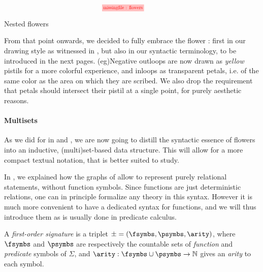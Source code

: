 \begin{scope}
\begin{marginfigure}
  $$
  \!\!\!\!
  \!\!\!\!
  \!\!\!\!
  \!\!\!\!
  \stkfig{0.65}{flowers}
  $$
  \vspace{-3em}
  \caption{Nested flowers}
\end{marginfigure}

From that point onwards, we decided to fully embrace the flower :
first in our drawing style as witnessed in , but also in our
syntactic terminology, to be introduced in the next pages. \kl(eg){Negative}
outloops are now drawn as \emph{yellow} pistils for a more colorful experience,
and inloops as transparent petals, i.e. of the same color as the area on which
they are scribed. We also drop the requirement that petals should intersect
their pistil at a single point, for purely aesthetic reasons.

\paragraph{Multisets}

As we did for   in  and , we are
now going to distill the syntactic essence of flowers into an inductive,
(multi)set-based data structure. This will allow for a more compact textual
notation, that is better suited to  study.

In , we explained how the graphs of  allow to represent
purely relational statements, without function symbols. Since functions are just
deterministic relations, one can in principle formalize any  theory
in this syntax. However it is much more convenient to
have a dedicated syntax for functions, and we will thus introduce them as is
usually done in predicate calculus.

\begin{definition}
  A \emph{first-order signature} is a triplet $\mathcal{\Sigma} = (
  \fsymbs, \psymbs, \arity )$, where $\fsymbs$ and $\psymbs$ are
  respectively the countable sets of \emph{function} and \emph{predicate}
  symbols of $\Sigma$, and $\arity : \fsymbs \cup \psymbs \to \nats$ gives an
  \emph{arity} to each symbol.
\end{definition}


\end{scope}
